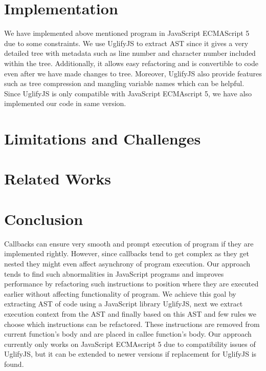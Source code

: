 \documentclass[10pt,conference]{IEEEtran}
\begin{document}
\section{Implementation}
We have implemented above mentioned program in JavaScript ECMAScript 5 due to some constraints. We use UglifyJS to extract AST since it gives a very detailed tree with metadata such as line number and character number included within the tree. Additionally, it allows easy refactoring and is convertible to code even after we have made changes to tree. Moreover, UglifyJS also provide features such as tree compression and mangling variable names which can be helpful. Since UglifyJS is only compatible with JavaScript ECMAscript 5, we have also implemented our code in same version.
\section{Limitations and Challenges}
\section{Related Works}
\section{Conclusion}
Callbacks can ensure very smooth and prompt execution of program if they are implemented rightly. However, since callbacks tend to get complex as they get nested they might even affect asynchrony of program execution. Our approach tends to find such abnormalities in JavaScript programs and improves performance by refactoring such instructions to position where they are executed earlier without affecting functionality of program. We achieve this goal by extracting AST of code using a JavaScript library UglifyJS, next we extract execution context from the AST and finally based on this AST and few rules we choose which instructions can be refactored. These instructions are removed from current function’s body and are placed in callee function’s body. Our approach currently only works on JavaScript ECMAscript 5 due to compatibility issues of UglifyJS, but it can be extended to newer versions if replacement for UglifyJS is found. 
\end{document}
